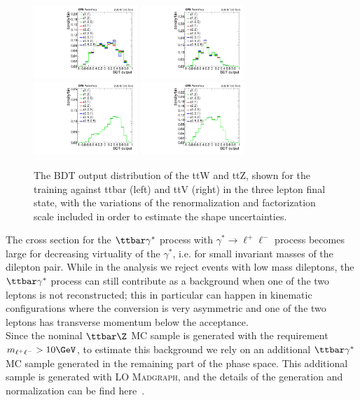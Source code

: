 \begin{figure}[htb]
	\centering 
\includegraphics[width=0.35\textwidth]{plots_irreduciblebkg/3l/muR_muF_ttW/kinMVA_3l_ttbar}
\includegraphics[width=0.35\textwidth]{plots_irreduciblebkg/3l/muR_muF_ttW/kinMVA_3l_ttV}
\includegraphics[width=0.35\textwidth]{plots_irreduciblebkg/3l/muR_muF_ttZ/kinMVA_3l_ttbar}
\includegraphics[width=0.35\textwidth]{plots_irreduciblebkg/3l/muR_muF_ttZ/kinMVA_3l_ttV}
	\caption{The BDT output distribution of the ttW and ttZ, shown for the training against ttbar 
	(left) and ttV (right) in the three lepton final state, with the variations of the
	renormalization and factorization scale included in order to estimate the shape uncertainties.}
	\label{fig:TTVScaleonBDTshape3l}
\end{figure}


The cross section for the $\ttbar\gamma^*$ process with $\gamma^*\to\ell^+\ell^-$ process becomes large for decreasing virtuality of the $\gamma^*$, i.e. for small invariant masses of the dilepton pair. While in the analysis we reject events with low mass dileptons, the $\ttbar\gamma^*$ process can still contribute as a background when one of the two leptons is not reconstructed; this in particular can happen in kinematic configurations where the conversion is very asymmetric and one of the two leptons has transverse momentum below the acceptance.\\
Since the nominal $\ttbar\Z$ MC sample is generated with the
requirement $m_{\ell^+\ell^-} > 10\GeV$, to estimate this background
we rely on an additional $\ttbar\gamma^*$ MC sample generated in the
remaining part of the phase space. This additional sample is generated
with LO \textsc{Madgraph}, and the details of the generation and
normalization can be find here~\cite{lowMll}.

